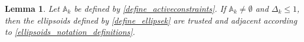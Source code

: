 \documentclass{article}
\newtheorem{lemma}[theorem]{Lemma}
\theoremstyle{case}
\numberwithin{theorem}{subsection}
\newcommand{\activeconstraintsk}{{\mathbb A_{k}}}
\newcommand{\bs}{{\beta^{(\star, k)}}}
\newcommand{\bsk}{{\beta_0^{(\star, k)}}}
\newcommand{\dacc}{{\Delta_{\textrm{acc}}}}
\newcommand{\dk}{\Delta_k}
\newcommand{\rotk}{{R^{(k)}}}
\begin{document}
\begin{lemma}
\label{ellsoid_is_suitable_theorem_p2}
Let $\activeconstraintsk$ be defined by \cref{define_activeconstraints}.
If $\activeconstraintsk \ne \emptyset$ and $\dk \le 1$, then the ellipsoids defined by \cref{define_ellipsek} are trusted and adjacent according to \cref{ellipsoids_notation_definitions}.

\end{lemma}
\end{document}
